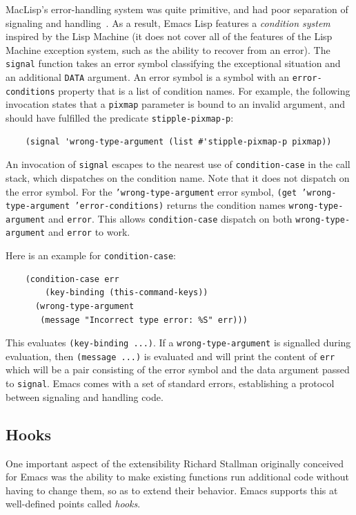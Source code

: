 \documentclass[format=acmsmall,screen]{acmart}
\newcommand \Elisp {Emacs Lisp}
\begin{document}
MacLisp's error-handling system was quite primitive, and had poor separation
of signaling and handling~\cite{Pitman2001}.
As a result, \Elisp{} features
a \emph{condition system} inspired by the Lisp Machine (it does
not cover all of the features of the Lisp Machine exception system, such as the ability
to recover from an error).
The \texttt{signal} function takes an error symbol classifying the
exceptional situation and an additional \texttt{DATA} argument.  An error
symbol is a symbol with an \texttt{error-conditions} property that is a list
of condition names.  For example, the following invocation states that
a \texttt{pixmap} parameter is bound to an invalid argument, and
should have fulfilled the predicate \texttt{stipple-pixmap-p}:
\begin{verbatim}
    (signal 'wrong-type-argument (list #'stipple-pixmap-p pixmap))
\end{verbatim}
An invocation of \texttt{signal} escapes to the nearest use of
\texttt{condition-case} in the call stack, which dispatches on the
condition name.  Note that it does not dispatch on the error symbol.
For the \texttt{'wrong-type-argument} error symbol, \texttt{(get
  'wrong-type-argument 'error-conditions)} returns the condition names
\texttt{wrong-type-argument} and \texttt{error}.  This allows
\texttt{condition-case} dispatch on both \texttt{wrong-type-argument}
and \texttt{error} to work.

Here is an example for \texttt{condition-case}:
\begin{Verbatim}
    (condition-case err
        (key-binding (this-command-keys))
      (wrong-type-argument
       (message "Incorrect type error: %S" err)))
\end{Verbatim}
This evaluates \texttt{(key-binding ...)}.  If a
\texttt{wrong-type-argument} is signalled during evaluation,
then \texttt{(message ...)} is evaluated and will print the content of
\texttt{err} which will be a pair
consisting of the error symbol and the data argument passed to
\texttt{signal}.
Emacs comes with a set of standard errors, establishing a protocol
between signaling and handling code.

\subsection{Hooks}
\label{sec:hooks}
\label{sec:advice}

One important aspect of the extensibility Richard Stallman originally
conceived for Emacs was the ability to make existing functions run
additional code without having to change them, so as to extend their
behavior.  Emacs supports this at well-defined points called
\emph{hooks}.
\end{document}
